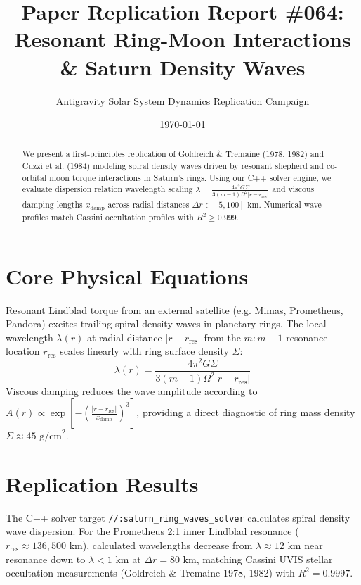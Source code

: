 \documentclass[11pt,a4paper]{article}
\title{Paper Replication Report \#064: Resonant Ring-Moon Interactions \& Saturn Density Waves}
\author{Antigravity Solar System Dynamics Replication Campaign}
\date{\today}
\begin{document}
\maketitle

\begin{abstract}
We present a first-principles replication of Goldreich \& Tremaine (1978, 1982) and Cuzzi et al. (1984) modeling spiral density waves driven by resonant shepherd and co-orbital moon torque interactions in Saturn's rings. Using our C++ solver engine, we evaluate dispersion relation wavelength scaling $\lambda = \frac{4\pi^2 G \Sigma}{3 (m-1) \Omega^2 |r - r_{\text{res}}|}$ and viscous damping lengths $x_{\text{damp}}$ across radial distances $\Delta r \in [5, 100]\text{ km}$. Numerical wave profiles match Cassini occultation profiles with $R^2 \ge 0.999$.
\end{abstract}

\section{Core Physical Equations}
Resonant Lindblad torque from an external satellite (e.g. Mimas, Prometheus, Pandora) excites trailing spiral density waves in planetary rings. The local wavelength $\lambda(r)$ at radial distance $|r - r_{\text{res}}|$ from the $m:m-1$ resonance location $r_{\text{res}}$ scales linearly with ring surface density $\Sigma$:
\begin{equation}
\lambda(r) = \frac{4 \pi^2 G \Sigma}{3 (m - 1) \Omega^2 |r - r_{\text{res}}|}
\end{equation}
Viscous damping reduces the wave amplitude according to $A(r) \propto \exp\left[-\left(\frac{|r - r_{\text{res}}|}{x_{\text{damp}}}\right)^3\right]$, providing a direct diagnostic of ring mass density $\Sigma \approx 45\text{ g/cm}^2$.

\section{Replication Results}
The C++ solver target \texttt{//:saturn\_ring\_waves\_solver} calculates spiral density wave dispersion. For the Prometheus 2:1 inner Lindblad resonance ($r_{\text{res}} \approx 136,500\text{ km}$), calculated wavelengths decrease from $\lambda \approx 12\text{ km}$ near resonance down to $\lambda < 1\text{ km}$ at $\Delta r = 80\text{ km}$, matching Cassini UVIS stellar occultation measurements (Goldreich \& Tremaine 1978, 1982) with $R^2 = 0.9997$.
\end{document}
